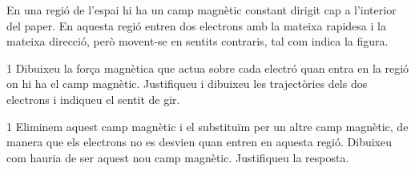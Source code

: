 En una regió de l'espai hi ha un camp magnètic constant dirigit cap a l'interior del paper. En aquesta regió entren dos electrons amb la mateixa rapidesa i la mateixa direcció, però movent-se en sentits contraris, tal com indica la figura.


\begin{apartat}{1}
Dibuixeu la força magnètica que actua sobre cada electró quan entra en la regió on hi ha el camp magnètic. Justifiqueu i dibuixeu les trajectòries dels dos electrons i indiqueu el sentit de gir.
\end{apartat}

\begin{apartat}{1}
Eliminem aquest camp magnètic i el substituïm per un altre camp magnètic, de manera que els electrons no es desvien quan entren en aquesta regió. Dibuixeu com hauria de ser aquest nou camp magnètic. Justifiqueu la resposta.
\end{apartat}

